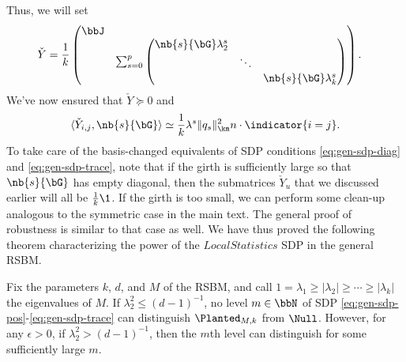 Thus, we will set
\begin{align*}
    \check Y 
    &= \frac{1}{k} 
    \begin{pmatrix} \bbJ & \\
     & \sum_{s=0}^p \begin{pmatrix} \nb{s}{\bG}\lambda_2^s & & \\ & \ddots & \\ & & \nb{s}{\bG}\lambda_k^s \end{pmatrix}
     \end{pmatrix}.  
\end{align*}
We've now ensured that $\check Y \succeq 0$ and
$$
    \langle \check Y_{i,j}, \nb{s}{\bG} \rangle \simeq \frac{1}{k}\lambda^s \|q_s\|^2_{\km} n \cdot \indicator{i=j}.
$$
To take care of the basis-changed equivalents of SDP conditions \eqref{eq:gen-sdp-diag} and \eqref{eq:gen-sdp-trace}, note that if the girth is sufficiently large so that $\nb{s}{\bG}$ has empty diagonal, then the submatrices $\check Y_u$ that we discussed earlier will all be $\tfrac{1}{k}\1$. If the girth is too small, we can perform some clean-up analogous to the symmetric case in the main text. The general proof of robustness is similar to that case as well. We have thus proved the following theorem characterizing the power of the $LocalStatistics$ SDP in the general RSBM.

\begin{theorem}
    Fix the parameters $k$, $d$, and $M$ of the RSBM, and call $1 = \lambda_1 \ge |\lambda_2| \ge \cdots \ge |\lambda_k|$ the eigenvalues of $M$. If $\lambda_2^2 \le (d-1)^{-1}$, no level $m \in \bbN$ of  SDP \eqref{eq:gen-sdp-pos}-\eqref{eq:gen-sdp-trace} can distinguish $\Planted_{M,k}$ from $\Null$. However, for any $\epsilon> 0$, if $\lambda_2^2 > (d-1)^{-1}$, then the $m$th level can distinguish for some sufficiently large $m$.
\end{theorem}